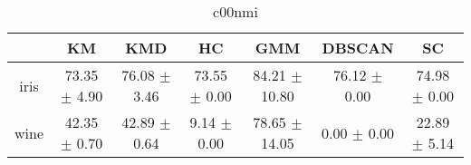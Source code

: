\begin{table}
\centering
\begin{tabular}{ccccccc}
\toprule
 & KM & KMD & HC & GMM & DBSCAN & SC \\
\midrule
iris & 73.35 $\pm$ 4.90 & 76.08 $\pm$ 3.46 & 73.55 $\pm$ 0.00 & 84.21 $\pm$ 10.80 & 76.12 $\pm$ 0.00 & 74.98 $\pm$ 0.00 \\
wine & 42.35 $\pm$ 0.70 & 42.89 $\pm$ 0.64 & 9.14 $\pm$ 0.00 & 78.65 $\pm$ 14.05 & 0.00 $\pm$ 0.00 & 22.89 $\pm$ 5.14 \\
\bottomrule
\end{tabular}
\caption{c00nmi}
\label{table:c00nmi}
\end{table}

